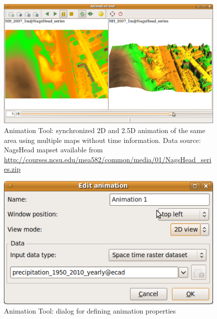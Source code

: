 \documentclass[a4paper,12pt,oneside]{book}
\newcommand{\at}{Animation Tool\xspace}
\begin{document}
\begin{figure}[h!]
  \centering
  \includegraphics[width=\textwidth]{./images/animation_tool2.png}
  \caption[\at: synchronized 2D and 2.5D animation of the same area using
  multiple maps without time information]
  {\at: synchronized 2D and 2.5D animation of the same area using
  multiple maps without time information. Data source: NagsHead mapset available from
  \url{http://courses.ncsu.edu/mea582/common/media/01/NagsHead_series.zip}}
  \label{fig:anim3D}
\end{figure}

\begin{figure}[h!]
  \centering
  \includegraphics{./images/animation_tool_edit.png}
  \caption{\at: dialog for defining animation properties}
  \label{fig:anim_edit}
\end{figure}
\end{document}
